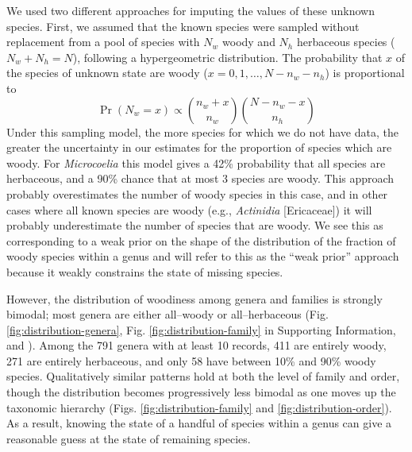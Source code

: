 \documentclass[a4paper,12pt]{article}
\begin{document}
We used two different approaches for imputing the values of these
unknown species. First, we assumed that the known species were sampled
without replacement from a pool of species with $N_w$ woody and $N_h$
herbaceous species ($N_w + N_h = N$), following a hypergeometric
distribution. The probability that $x$ of the species of unknown state
are woody ($x = 0, 1, \ldots, N - n_w - n_h$) is proportional to
\begin{equation}
  \Pr(N_w = x) \propto {n_w + x \choose n_w}
  {N - n_w - x \choose n_h}
\end{equation}
Under this sampling model, the more species for which we do not have data,
the greater the uncertainty in our estimates for the proportion of species
which are woody.
%
For \textit{Microcoelia} this model gives a 42\% probability that all
species are herbaceous, and a 90\% chance that at most 3 species
are woody.
This approach probably overestimates the number of woody species in
this case, and in other cases where all known species are woody (e.g.,
\textit{Actinidia} [Ericaceae]) it will probably underestimate the
number of species that are woody. We see this as corresponding to a
weak prior on the shape of the distribution of the fraction of woody
species within a genus and will refer to this as the ``weak prior''
approach because it weakly constrains the state of missing species.

However, the distribution of woodiness among genera and families is
strongly bimodal; most genera are either all--woody or all--herbaceous
(Fig. \ref{fig:distribution-genera}, Fig. \ref{fig:distribution-family} in 
Supporting Information, and 
\citealt{sinnott1915evolution}).  Among the 791 genera with at least 10
records, 411 are entirely woody, 271 are entirely herbaceous, and only
58 have between 10\% and 90\% woody species. Qualitatively similar patterns
hold at both the level of family and order, though the distribution
becomes progressively less bimodal as one moves up the taxonomic hierarchy 
(Figs. \ref{fig:distribution-family} and \ref{fig:distribution-order}). 
As a result, knowing the state of a handful of species within a genus 
can give a reasonable guess at the state of remaining species.
\end{document}
